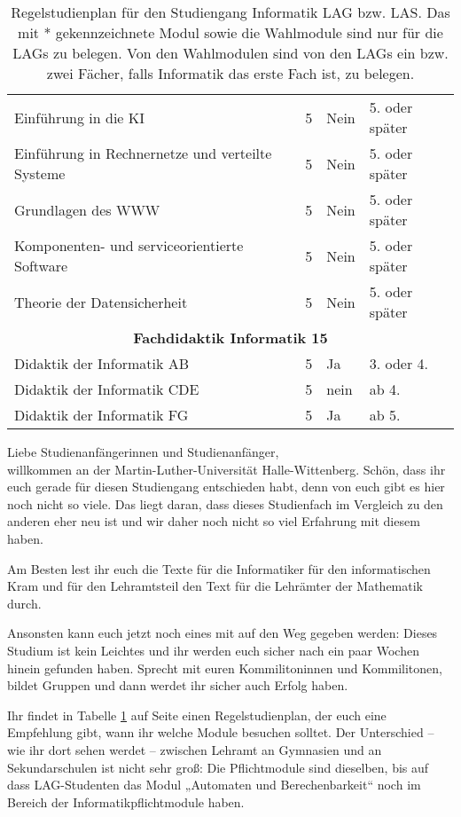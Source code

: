 \begin{table}[tbp]
\begin{footnotesize}
\begin{tabularx}{\textwidth}{|b{}|X|X|X|}
        Einführung in die KI                             & 5 & Nein & 5. oder später \\
        Einführung in Rechnernetze und verteilte Systeme & 5 & Nein & 5. oder später \\
        Grundlagen des WWW                               & 5 & Nein & 5. oder später \\
        Komponenten- und serviceorientierte Software     & 5 & Nein & 5. oder später \\
        Theorie der Datensicherheit                      & 5 & Nein & 5. oder später \\
        \hline
        \multicolumn{4}{|c|}{\textbf{Fachdidaktik Informatik 15}}\\\hline
        Didaktik der Informatik AB  & 5 & Ja   & 3. oder 4. \\
        Didaktik der Informatik CDE & 5 & nein & ab 4. \\
        Didaktik der Informatik FG  & 5 & Ja   & ab 5. \\
        \hline
    \end{tabularx}
    \end{footnotesize}
    \caption{\label{plan-laI}Regelstudienplan für den Studiengang Informatik LAG bzw. LAS. Das mit * gekennzeichnete Modul sowie die Wahlmodule sind nur für die LAGs zu belegen. Von den Wahlmodulen sind von den LAGs ein bzw. zwei Fächer, falls Informatik das erste Fach ist, zu belegen.}
\end{table}

Liebe Studienanfängerinnen und Studienanfänger,\\
willkommen an der Martin-Luther-Universität Halle-Wittenberg.
Schön, dass ihr euch gerade für diesen Studiengang entschieden habt, denn von euch gibt es hier noch nicht so viele.
Das liegt daran, dass dieses Studienfach im Vergleich zu den anderen eher neu ist und wir daher noch nicht so viel Erfahrung mit diesem haben.

Am Besten lest ihr euch die Texte für die Informatiker für den informatischen Kram und für den Lehramtsteil den Text für die Lehrämter der Mathematik durch.

Ansonsten kann euch jetzt noch eines mit auf den Weg gegeben werden:
Dieses Studium ist kein Leichtes und ihr werden euch sicher nach ein paar Wochen hinein gefunden haben.
Sprecht mit euren Kommilitoninnen und Kommilitonen, bildet Gruppen und dann werdet ihr sicher auch Erfolg haben.

Ihr findet in Tabelle \ref{plan-laI} auf Seite \pageref{plan-laI} einen Regelstudienplan, der euch eine Empfehlung gibt, wann ihr welche Module besuchen solltet.
Der Unterschied  -- wie ihr dort sehen werdet -- zwischen Lehramt an Gymnasien und an Sekundarschulen ist nicht sehr groß:
Die Pflichtmodule sind dieselben, bis auf dass LAG-Studenten das Modul „Automaten und Berechenbarkeit“ noch im Bereich der Informatikpflichtmodule haben.

